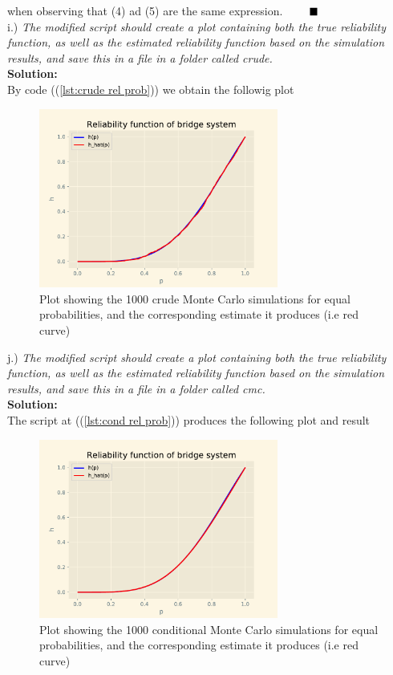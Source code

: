 \documentclass[12pt,
               a4paper,
               article,
               oneside,
               english,oldfontcommands]{memoir}
\newcommand{\Q}{ \qquad \hfill \blacksquare}
\let\oldref\ref
\renewcommand{\ref}[1]{(\oldref{#1})}
\newcommand{\spaze}{\vspace{4mm}\\}
\begin{document}
when observing that (4) ad (5) are the same expression. $\Q$ \spaze 
i.) \emph{The modified script should create a plot containing both the true reliability function, as well as the estimated reliability function based on the simulation results, and save this in a file in a folder called crude.} \spaze 
\textbf{Solution:} \spaze 
By code  (\ref{lst:crude rel prob}) we obtain the followig plot 
\begin{figure}[H]
\centering 
\includegraphics[width=0.7\textwidth]{crude/bridge.pdf}
\caption{Plot showing the 1000 crude Monte Carlo simulations for equal probabilities, and the corresponding estimate it produces (i.e red curve)}
\end{figure}
j.) \emph{The modified script should create a plot containing both the true reliability function, as well as the estimated reliability function based on the simulation results, and save this in a file in a folder called cmc.} \spaze
\textbf{Solution:} \spaze 
The script at (\ref{lst:cond rel prob}) produces the following plot and result 
\begin{figure}[H]
\centering 
\includegraphics[width=0.7\textwidth]{cmc/bridge.pdf}
\caption{Plot showing the 1000 conditional Monte Carlo simulations for equal probabilities, and the corresponding estimate it produces (i.e red curve)}
\end{figure}
\end{document}
